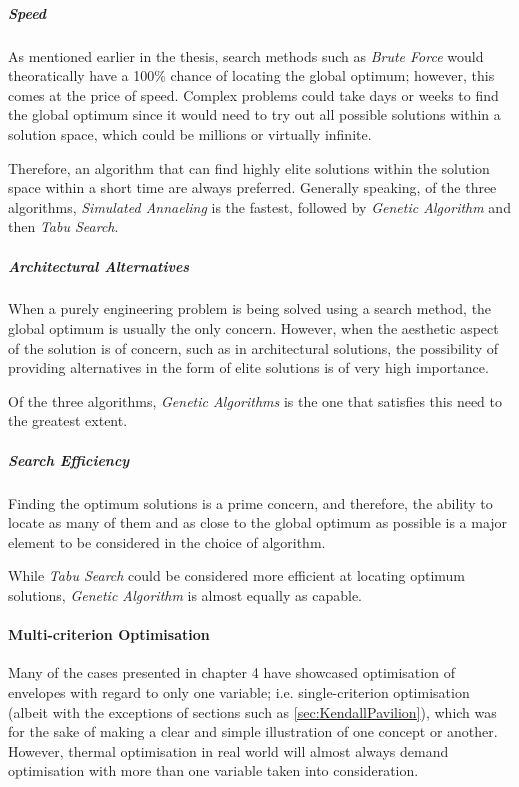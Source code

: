\subparagraph{Speed}

As mentioned earlier in the thesis, search methods such as \emph{Brute Force} would theoratically have a 100\% chance of locating the global optimum; however, this comes at the price of speed. Complex problems could take days or weeks to find the global optimum since it would need to try out all possible solutions within a solution space, which could be millions or virtually infinite.

Therefore, an algorithm that can find highly elite solutions within the solution space within a short time are always preferred. Generally speaking, of the three algorithms, \emph{Simulated Annaeling} is the fastest, followed by \emph{Genetic Algorithm} and then \emph{Tabu Search}.

\subparagraph{Architectural Alternatives}

When a purely engineering problem is being solved using a search method, the global optimum is usually the only concern. However, when the aesthetic aspect of the solution is of concern, such as in architectural solutions, the possibility of providing alternatives in the form of elite solutions is of very high importance.

Of the three algorithms, \emph{Genetic Algorithms} is the one that satisfies this need to the greatest extent.

\subparagraph{Search Efficiency}

Finding the optimum solutions is a prime concern, and therefore, the ability to locate as many of them and as close to the global optimum as possible is a major element to be considered in the choice of algorithm.

While \emph{Tabu Search} could be considered more efficient at locating optimum solutions, \emph{Genetic Algorithm} is almost equally as capable.

\paragraph{Multi-criterion Optimisation} \mbox{}

Many of the cases presented in chapter 4 have showcased optimisation of envelopes with regard to only one variable; i.e. single-criterion optimisation (albeit with the exceptions of sections such as \ref{sec:KendallPavilion}), which was for the sake of making a clear and simple illustration of one concept or another. However, thermal optimisation in real world will almost always demand optimisation with more than one variable taken into consideration.

